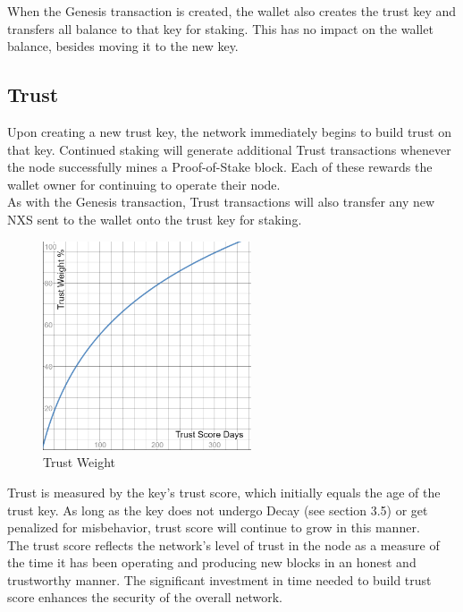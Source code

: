\documentclass[11pt]{article}
\begin{document}
\noindent When the Genesis transaction is created, the wallet also creates the trust key and transfers all balance to that key for staking. This has no impact on the wallet balance, besides moving it to the new key.\\

\subsection{Trust}
Upon creating a new trust key, the network immediately begins to build trust on that key. Continued staking will generate additional Trust transactions whenever the node successfully mines a Proof-of-Stake block. Each of these rewards the wallet owner for continuing to operate their node.\\

\noindent As with the Genesis transaction, Trust transactions will also transfer any new NXS sent to the wallet onto the trust key for staking. \\

\begin{figure}
    \centering
    \includegraphics[width=0.55\textwidth]{images/trustWeight.png}
    \caption{Trust Weight \label{fig:trustWeight}}
\end{figure}

\noindent Trust is measured by the key’s trust score, which initially equals the age of the trust key. As long as the key does not undergo Decay (see section 3.5) or get penalized for misbehavior, trust score will continue to grow in this manner.\\

\noindent The trust score reflects the network’s level of trust in the node as a measure of the time it has been operating and producing new blocks in an honest and trustworthy manner. The significant investment in time needed to build trust score enhances the security of the overall network.\\
\end{document}
